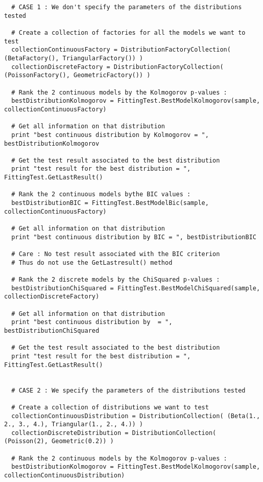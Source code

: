 \begin{lstlisting}
  # CASE 1 : We don't specify the parameters of the distributions tested

  # Create a collection of factories for all the models we want to test
  collectionContinuousFactory = DistributionFactoryCollection( (BetaFactory(), TriangularFactory()) )
  collectionDiscreteFactory = DistributionFactoryCollection( (PoissonFactory(), GeometricFactory()) )

  # Rank the 2 continuous models by the Kolmogorov p-values :
  bestDistributionKolmogorov = FittingTest.BestModelKolmogorov(sample, collectionContinuousFactory)

  # Get all information on that distribution
  print "best continuous distribution by Kolmogorov = ", bestDistributionKolmogorov

  # Get the test result associated to the best distribution
  print "test result for the best distribution = ", FittingTest.GetLastResult()

  # Rank the 2 continuous models bythe BIC values :
  bestDistributionBIC = FittingTest.BestModelBic(sample, collectionContinuousFactory)

  # Get all information on that distribution
  print "best continuous distribution by BIC = ", bestDistributionBIC

  # Care : No test result associated with the BIC criterion
  # Thus do not use the GetLastresult() method

  # Rank the 2 discrete models by the ChiSquared p-values :
  bestDistributionChiSquared = FittingTest.BestModelChiSquared(sample, collectionDiscreteFactory)

  # Get all information on that distribution
  print "best continuous distribution by  = ", bestDistributionChiSquared

  # Get the test result associated to the best distribution
  print "test result for the best distribution = ", FittingTest.GetLastResult()


  # CASE 2 : We specify the parameters of the distributions tested

  # Create a collection of distributions we want to test
  collectionContinuousDistribution = DistributionCollection( (Beta(1., 2., 3., 4.), Triangular(1., 2., 4.)) )
  collectionDiscreteDistribution = DistributionCollection( (Poisson(2), Geometric(0.2)) )

  # Rank the 2 continuous models by the Kolmogorov p-values :
  bestDistributionKolmogorov = FittingTest.BestModelKolmogorov(sample, collectionContinuousDistribution)


\end{lstlisting}
